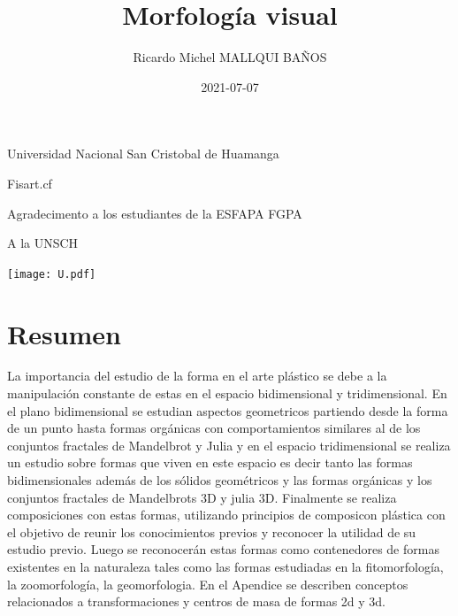 \documentclass[16pt,]{krantz}
\title{Morfología visual}
\author{Ricardo Michel MALLQUI BAÑOS}
\institute{Universidad Nacional San Cristóbal De Huamanga}
\date{2021-07-07}
\theoremstyle{definition}
\theoremstyle{definition}
\theoremstyle{definition}
\theoremstyle{definition}
\theoremstyle{remark}
\begin{document}
\maketitle

\thispagestyle{empty}
\begin{flushright}
Universidad Nacional San Cristobal de Huamanga

Fisart.cf

Agradecimento a los estudiantes de la ESFAPA FGPA

A la UNSCH

\texttt{[image: U.pdf]}
\end{flushright}

{
\hypersetup{linkcolor=}
\setcounter{tocdepth}{2}
\tableofcontents
}
\listoftables
\listoffigures
\newcommand{\N}{\mathbb{N}}
\newcommand{\R}{\mathbb{R}}
\newcommand{\CC}{\mathbb{C}}
\newcommand{\I}{\mathbb{I}}
\newcommand{\f}{\mathbb{f}}
\newcommand{\X}{\mathbb{X}}
\newcommand{\D}{\mathbb{D}}
\newcommand{\Z}{\mathbb{Z}}
\newcommand{\Q}{\mathbb{Q}}
\newcommand{\norm}[1]{\left\Vert#1\right\Vert}
\newcommand{\abs}[1]{\left\vert#1\right\vert}
\newcommand{\set}[1]{\left\{#1\right\}}
\newcommand{\seq}[1]{\left<#1\right>}
\newcommand{\co}[1]{\left[#1\right]}
\newcommand{\cc}[1]{\left(#1\right)}
\newcommand{\J}{\mathcal{J}}
\newcommand{\K}{\mathcal{K}}
\newcommand{\M}{\mathcal{M}}
\newcommand{\F}{\mathcal{F}}

\hypertarget{resumen}{%
\chapter*{Resumen}\label{resumen}}


La importancia del estudio de la forma en el arte plástico se debe a la manipulación constante de estas en el espacio bidimensional y tridimensional. En el plano bidimensional se estudian aspectos geometricos partiendo desde la forma de un punto hasta formas orgánicas con comportamientos similares al de los conjuntos fractales de Mandelbrot y Julia y en el espacio tridimensional se realiza un estudio sobre formas que viven en este espacio es decir tanto las formas bidimensionales además de los sólidos geométricos y las formas orgánicas y los conjuntos fractales de Mandelbrots 3D y julia 3D. Finalmente se realiza composiciones con estas formas, utilizando principios de composicon plástica con el objetivo de reunir los conocimientos previos y reconocer la utilidad de su estudio previo. Luego se reconocerán estas formas como contenedores de formas existentes en la naturaleza tales como las formas estudiadas en la fitomorfología, la zoomorfología, la geomorfologia. En el Apendice se describen conceptos relacionados a transformaciones y centros de masa de formas 2d y 3d.
\end{document}
